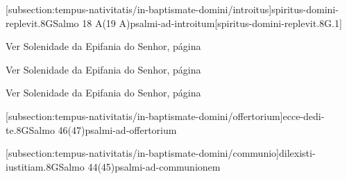 \def\Prefix{subsection:tempus-nativitatis/in-baptismate-domini}

[\Prefix/introitus]{spiritus-domini-replevit.8G}{Salmo 18 A(19 A)}{psalmi-ad-introitum}[spiritus-domini-replevit.8G.1]

\AllowPageFlush

\begin{rubrica}
  Ver Solenidade da Epifania do Senhor, página~\pageref{subsection:tempus-nativitatis/in-epiphania-domini/psalmus-responsorius}
\end{rubrica}

\begin{rubrica}
  Ver Solenidade da Epifania do Senhor, página~\pageref{subsection:tempus-nativitatis/in-epiphania-domini/alleluia}
\end{rubrica}

\begin{rubrica}
  Ver Solenidade da Epifania do Senhor, página~\pageref{subsection:tempus-nativitatis/in-epiphania-domini/psalmus-alleluiaticus}
\end{rubrica}

\AllowPageFlush

[\Prefix/offertorium]{ecce-dedi-te.8G}{Salmo 46(47)}{psalmi-ad-offertorium}

\AllowPageBreak

[\Prefix/communio]{dilexisti-iustitiam.8G}{Salmo 44(45)}{psalmi-ad-communionem}